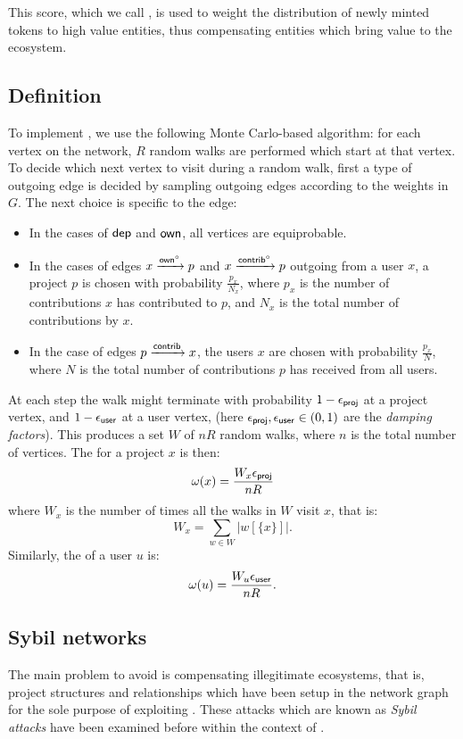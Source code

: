 This score, which we call \osrank{}, is used to weight the
distribution of newly minted tokens to high value entities, thus
compensating entities which bring value to the ecosystem.

\subsection{Definition}

To implement \osrank{}, we use the following Monte Carlo-based algorithm: for
each vertex on the network, $R$ random walks are performed which start at that
vertex. To decide which next vertex to visit during a random walk, first a type
of outgoing edge is decided by sampling outgoing edges according to the weights
in $G$. The next choice is specific to the edge:

\begin{itemize}
\item In the cases of $\mathsf{dep}$ and $\mathsf{own}$, all vertices are equiprobable.
\item In the cases of edges $x \xrightarrow[]{\mathsf{own}^\circ} p$ and
  $x \xrightarrow[]{\mathsf{contrib}^\circ} p$ outgoing from a user $x$, a project $p$ is
  chosen with probability $\frac{p_x}{N_x}$, where $p_x$ is the number of
  contributions $x$ has contributed to $p$, and $N_x$ is the total number of
  contributions by $x$.
\item In the case of edges $p \xrightarrow[]{\mathsf{contrib}} x$, the users $x$ are
  chosen with probability $\frac{p_x}{N}$, where $N$ is the total number of
  contributions $p$ has received from all users.
\end{itemize}

At each step the walk might terminate with probability $1 - \epsilon_{\mathsf{proj}}$ at a
project vertex, and $1 - \epsilon_{\mathsf{user}}$ at a user vertex, (here
$\epsilon_{\mathsf{proj}}, \epsilon_{\mathsf{user}} \in (0,1)$ are the \emph{damping factors}). This
produces a set $W$ of $nR$ random walks, where $n$ is the total number of
vertices. The \osrank{} for a project $x$ is then:
\[
  \omega(x) = \frac{W_x \epsilon_{\mathsf{proj}}}{n R}
\]
where $W_x$ is the number of times all the walks in $W$ visit $x$, that is:
\[
W_x = \sum_{w \in W} |w[\{x\}]|.
\]
Similarly, the \osrank{} of a user $u$ is:
\[
  \omega(u) = \frac{W_u \epsilon_{\mathsf{user}}}{n R}.
\]

\subsection{Sybil networks}

The main problem to avoid is compensating illegitimate ecosystems, that is,
project structures and relationships which have been setup in the
network graph for the sole purpose of exploiting \osrank{}.
These attacks which are known as \emph{Sybil attacks} have been examined
before \cite{pagerank-sybil} within the context of \pagerank{}.

